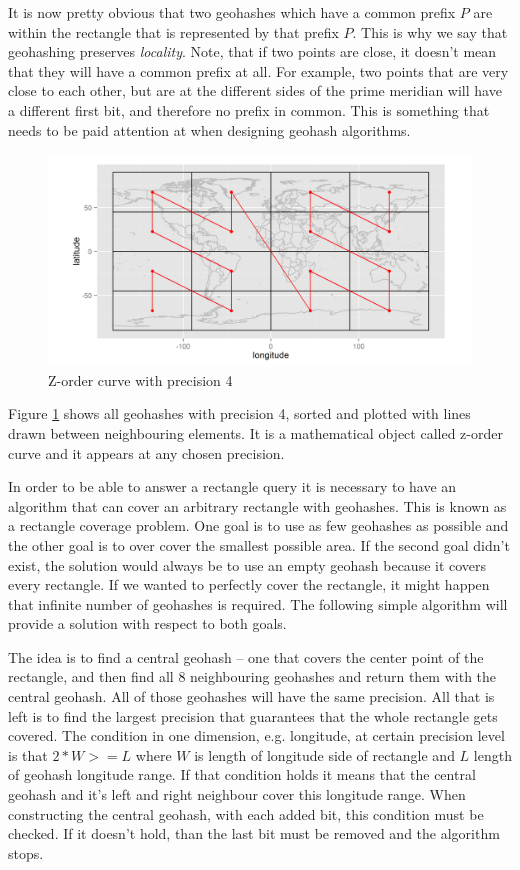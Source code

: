 \documentclass[times, utf8, diplomski]{fer}
\begin{document}
It is now pretty obvious that two geohashes which have a common prefix $P$ are within the rectangle that is represented by that prefix $P$. This is why we say that geohashing preserves \emph{locality}. Note, that if two points are close, it doesn't mean that they will have a common prefix at all. For example, two points that are very close to each other, but are at the different sides of the prime meridian will have a different first bit, and therefore no prefix in common. This is something that needs to be paid attention at when designing geohash algorithms.

\begin{figure}[h]
\includegraphics[width=\textwidth]{z_curve}
\caption{Z-order curve with precision 4 \cite {spatiotemporal}}
\label{fig:zcurve}
\end{figure}

Figure \ref{fig:zcurve} shows all geohashes with precision 4, sorted and plotted with lines drawn between neighbouring elements. It is a mathematical object called z-order curve \cite{zcurve} and it appears at any chosen precision.

In order to be able to answer a rectangle query it is necessary to have an algorithm that can cover an arbitrary rectangle with geohashes. This is known as a rectangle coverage problem. One goal is to use as few geohashes as possible and the other goal is to over cover the smallest possible area. If the second goal didn't exist, the solution would always be to use an empty geohash because it covers every rectangle. If we wanted to perfectly cover the rectangle, it might happen that infinite number of geohashes is required. The following simple algorithm will provide a solution with respect to both goals.

The idea is to find a central geohash -- one that covers the center point of the rectangle, and then find all 8 neighbouring geohashes and return them with the central geohash. All of those geohashes will have the same precision. All that is left is to find the largest precision that guarantees that the whole rectangle gets covered. The condition in one dimension, e.g. longitude, at certain precision level is that $2*W >= L$ where $W$ is length of longitude side of rectangle and $L$ length of geohash longitude range. If that condition holds it means that the central geohash and it's left and right neighbour cover this longitude range. When constructing the central geohash, with each added bit, this condition must be checked. If it doesn't hold, than the last bit must be removed and the algorithm stops.
\end{document}
